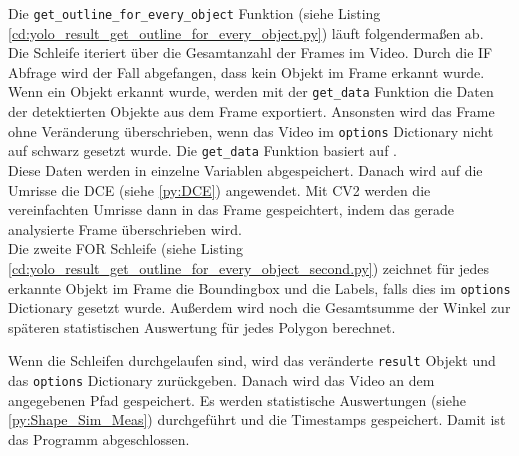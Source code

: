 {	Die \lstinline|get_outline_for_every_object| Funktion (siehe Listing \ref{cd:yolo_result_get_outline_for_every_object.py}) läuft folgendermaßen ab. \\
	Die Schleife iteriert über die Gesamtanzahl der Frames im Video. Durch die IF Abfrage wird der Fall abgefangen, dass kein Objekt im Frame erkannt wurde. Wenn ein Objekt erkannt wurde, werden mit der \lstinline|get_data| Funktion die Daten der detektierten Objekte aus dem Frame exportiert. Ansonsten wird das Frame ohne Veränderung überschrieben, wenn das Video im \lstinline|options| Dictionary nicht auf schwarz gesetzt wurde. Die \lstinline|get_data| Funktion basiert auf \citeauthor{Canu_pysource} \citep{Canu_pysource}. \\
	Diese Daten werden in einzelne Variablen abgespeichert. Danach wird auf die Umrisse die DCE (siehe \ref{py:DCE}) angewendet. Mit CV2 werden die vereinfachten Umrisse dann in das Frame gespeichtert, indem das gerade analysierte Frame überschrieben wird. \\
	
	Die zweite FOR Schleife (siehe Listing \ref{cd:yolo_result_get_outline_for_every_object_second.py}) zeichnet für jedes erkannte Objekt im Frame die Boundingbox und die Labels, falls dies im \lstinline|options| Dictionary gesetzt wurde. Außerdem wird noch die Gesamtsumme der Winkel  zur späteren statistischen Auswertung für jedes Polygon berechnet.
	
	Wenn die Schleifen durchgelaufen sind, wird das veränderte \lstinline|result| Objekt und das \lstinline|options| Dictionary zurückgeben. Danach wird das Video an dem angegebenen Pfad gespeichert. Es werden statistische Auswertungen (siehe \ref{py:Shape_Sim_Meas}) durchgeführt und die Timestamps gespeichert. Damit ist das Programm abgeschlossen. \\
	}

